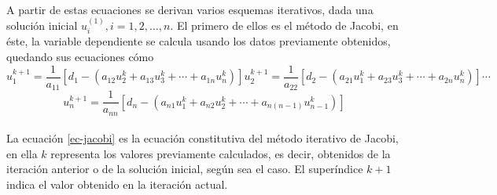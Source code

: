 \documentclass[letterpaper, openright, 12pt]{book}
\begin{document}
				\paragraph*{}
					A partir de estas ecuaciones se derivan varios esquemas iterativos, dada una solución inicial $u_{i}^{(1)}, i = 1, 2, \dotsc, n$. El primero de ellos es el método de Jacobi, en éste, la variable dependiente se calcula usando los datos previamente obtenidos, quedando sus ecuaciones cómo
					\begin{subequations}
						\begin{equation*}
							u_{1}^{k+1} = \frac{1}{a_{11}} \left[ d_{1} - \left( a_{12}u_{2}^{k} + a_{13}u_{3}^{k} + \dotsb + a_{1n}u_{n}^k \right) \right]
						\end{equation*}
						\begin{equation*}
						u_{2}^{k+1} = \frac{1}{a_{22}} \left[ d_{2} - \left( a_{21}u_{1}^{k} + a_{23}u_{3}^{k} + \dotsb + a_{2n}u_{n}^{k} \right) \right]
						\end{equation*}
						\begin{equation*}
						\dotsb
						\end{equation*}
					\end{subequations}
					\begin{equation}
						u_{n}^{k+1} = \frac{1}{a_{nn}} \left[ d_{n} - \left( a_{n1}u_{1}^{k} + a_{n2}u_{2}^{k} + \dotsb + a_{n\left( n-1 \right)}u_{n-1}^{k} \right) \right]
						\label{ec-jacobi}
					\end{equation}
					
				\paragraph*{}
					La ecuación \ref{ec-jacobi} es la ecuación constitutiva del método iterativo de Jacobi, en ella $k$ representa los valores previamente calculados, es decir, obtenidos de la iteración anterior o de la solución inicial, según sea el caso. El superíndice $k+1$ indica el valor obtenido en la iteración actual.
				
\end{document}
